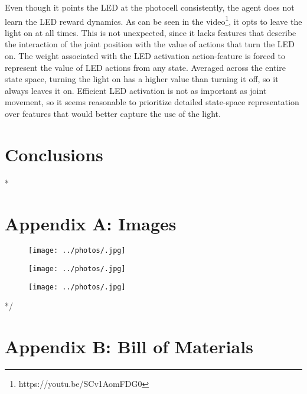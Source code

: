 \documentclass{article}
\begin{document}
Even though it points the LED at the photocell consistently, the agent does not learn the LED reward dynamics. As can be seen in the video\footnote{https://youtu.be/SCv1AomFDG0}, it opts to leave the light on at all times. This is not unexpected, since it lacks features that describe the interaction of the joint position with the value of actions that turn the LED on. The weight associated with the LED activation action-feature is forced to represent the value of LED actions from any state. Averaged across the entire state space, turning the light on has a higher value than turning it off, so it always leaves it on. Efficient LED activation is not as important as joint movement, so it seems reasonable to prioritize detailed state-space representation over features that would better capture the use of the light.




\section{Conclusions}



\clearpage

\/*
\section{Appendix A: Images}

	\begin{figure}[!htb]
		\centering
		\texttt{[image: ../photos/.jpg]}
		\label{fig:}
	\end{figure}
	
	\begin{figure}[!htb]
		\centering
		\texttt{[image: ../photos/.jpg]}
		\caption{}
		\label{fig:}
	\end{figure}
	
	\begin{figure}[!htb]
		\centering
		\texttt{[image: ../photos/.jpg]}
		\caption{}
		\label{fig:}
	\end{figure}
*/

\section{Appendix B: Bill of Materials}
\end{document}

